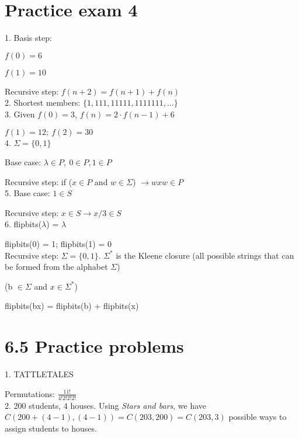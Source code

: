 \documentclass[english]{exam}
\begin{document}
	
    \section{Practice exam 4}
    
    1. Basis step:
    
    $f(0) = 6$
    
    $f(1) = 10$
    
    Recursive step: $f(n+2) = f(n+1) + f(n)$\\
    
    2. Shortest members: $\{1,111,11111,1111111,...\}$\\
    
    3. Given $f(0) = 3$, $f(n) = 2 \cdot f(n-1) + 6$
    
    $f(1) = 12;\ f(2) = 30$\\
    
    4. $\Sigma = \{0,1\}$
    
    Base case: $\lambda \in P,\ 0 \in P, 1 \in P$
    
    Recursive step: if ($x \in P$ and $w \in \Sigma$) $\rightarrow wxw \in P$\\
    
    5. Base case: $1 \in S$
    
    Recursive step: $x \in S \rightarrow x/3 \in S$\\
    
    6. flipbits($\lambda$) = $\lambda$
    
    flipbits(0) = 1; flipbits(1) = 0\\
    
    Recursive step: $\Sigma = \{0,1\}$. $\Sigma^*$ is the Kleene closure (all possible strings that can be formed from the alphabet $\Sigma$)
    
    (b $\in \Sigma$ and $x \in \Sigma^*$)
    
    flipbits(bx) = flipbits(b) + flipbits(x)\\
    
    \section{6.5 Practice problems}
    
    1. TATTLETALES
    
    Permutations: $\frac{11!}{4!2!2!2!}$\\
    
    2. 200 students, 4 houses. Using \textit{Stars and bars}, we have $C(200+(4-1), (4-1)) = C(203, 200) = C(203, 3)$ possible ways to assign students to houses.\\
    
\end{document}
